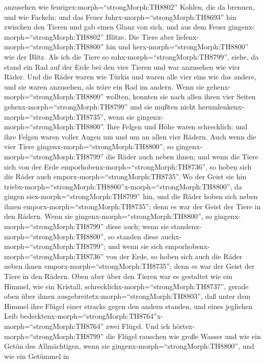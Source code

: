 anzusehen wie feurigex-morph=``strongMorph:TH8802'' Kohlen, die da
brennen, und wie Fackeln; und das Feuer
fuhrx-morph=``strongMorph:TH8693'' hin zwischen den Tieren und gab einen
Glanz von sich, und aus dem Feuer gingenx-morph=``strongMorph:TH8802''
Blitze.  Die Tiere aber
liefenx-morph=``strongMorph:TH8800'' hin und
herx-morph=``strongMorph:TH8800'' wie der Blitz.  Als ich
die Tiere so sahx-morph=``strongMorph:TH8799'', siehe, da stand ein Rad
auf der Erde bei den vier Tieren und war anzusehen wie vier Räder.
 Und die Räder waren wie Türkis und waren alle vier eins
wie das andere, und sie waren anzusehen, als wäre ein Rad im andern.
 Wenn sie gehenx-morph=``strongMorph:TH8800'' wollten,
konnten sie nach allen ihren vier Seiten
gehenx-morph=``strongMorph:TH8799'' und sie mußten nicht
herumlenkenx-morph=``strongMorph:TH8735'', wenn sie
gingenx-morph=``strongMorph:TH8800''.  Ihre Felgen und Höhe
waren schrecklich; und ihre Felgen waren voller Augen um und um an allen
vier Rädern.  Auch wenn die vier Tiere
gingenx-morph=``strongMorph:TH8800'', so
gingenx-morph=``strongMorph:TH8799'' die Räder auch neben ihnen; und
wenn die Tiere sich von der Erde
emporhobenx-morph=``strongMorph:TH8736'', so hoben sich die Räder auch
emporx-morph=``strongMorph:TH8735''.  Wo der Geist sie hin
triebx-morph=``strongMorph:TH8800''x-morph=``strongMorph:TH8800'', da
gingen siex-morph=``strongMorph:TH8799'' hin, und die Räder hoben sich
neben ihnen emporx-morph=``strongMorph:TH8735''; denn es war der Geist
der Tiere in den Rädern.  Wenn sie
gingenx-morph=``strongMorph:TH8800'', so
gingenx-morph=``strongMorph:TH8799'' diese auch; wenn sie
standenx-morph=``strongMorph:TH8800'', so standen diese
auchx-morph=``strongMorph:TH8799''; und wenn sie sich
emporhobenx-morph=``strongMorph:TH8736'' von der Erde, so hoben sich
auch die Räder neben ihnen emporx-morph=``strongMorph:TH8735''; denn es
war der Geist der Tiere in den Rädern.  Oben aber über den
Tieren war es gestaltet wie ein Himmel, wie ein Kristall,
schrecklichx-morph=``strongMorph:TH8737'', gerade oben über ihnen
ausgebreitetx-morph=``strongMorph:TH8803'',  daß unter dem
Himmel ihre Flügel einer stracks gegen den andern standen, und eines
jeglichen Leib
bedecktenx-morph=``strongMorph:TH8764''x-morph=``strongMorph:TH8764''
zwei Flügel.  Und ich hörtex-morph=``strongMorph:TH8799''
die Flügel rauschen wie große Wasser und wie ein Getön des Allmächtigen,
wenn sie gingenx-morph=``strongMorph:TH8800'', und wie ein Getümmel in
